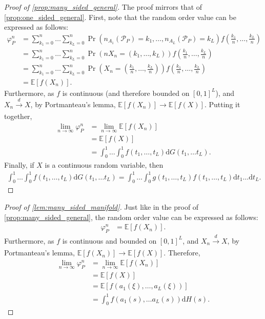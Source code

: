 \documentclass[a4paper]{article}
\newcommand{\dt}{\mathrm{d}t}
\newcommand{\dG}{\mathrm{d}G}
\newcommand{\E}{\mathbb{E}}
\begin{document}
\begin{proof}[Proof of \cref{prop:many_sided_general}]
    The proof mirrors that of \cref{prop:one_sided_general}.
    First, note that the random order value can be expressed as follows:
    \begin{align*}
        \varphi_P^n &= \sum_{k_1=0}^n \dots \sum_{k_L=0}^n \Pr(n_{A_1}(\mathcal{P}_P) = k_1, \dots, n_{A_L}(\mathcal{P}_P) = k_L) f\left(\frac{k_1}{n}, \dots, \frac{k_L}{n}\right) \\
        &= \sum_{k_1=0}^n \dots \sum_{k_L=0}^n \Pr(n X_n = (k_1, \dots, k_L)) f\left(\frac{k_1}{n}, \dots, \frac{k_L}{n}\right) \\
        &= \sum_{k_1=0}^n \dots \sum_{k_L=0}^n \Pr \left( X_n = \left(\frac{k_1}{n}, \dots, \frac{k_L}{n}\right) \right) f \left(\frac{k_1}{n}, \dots, \frac{k_L}{n}\right) \\
        &= \E[f(X_n)].
    \end{align*}
    Furthermore, as $f$ is continuous (and therefore bounded on $[0, 1]^L$), and $X_n \xrightarrow[]{d} X$, by Portmanteau's lemma, $\E[f(X_n)] \to \E[f(X)]$.
    Putting it together,
    \begin{align*}
        \lim_{n \to \infty} \varphi_P^n &= \lim_{n \to \infty} \E[f(X_n)] \\
        &= \E[f(X)] \\
        &= \int_0^1 \dots \int_0^1 f(t_1, \dots, t_L) \dG(t_1, \dots t_L).
    \end{align*}
    Finally, if $X$ is a continuous random variable, then
    \begin{align*}
        \int_0^1 \dots \int_0^1 f(t_1, \dots, t_L) \dG(t_1, \dots t_L) = \int_0^1\dots \int_0^1 g(t_1, \dots, t_L) f(t_1, \dots, t_L) \dt_1 \dots \dt_L.
    \end{align*}
\end{proof}

\begin{proof}[Proof of \cref{lem:many_sided_manifold}]
    Just like in the proof of \cref{prop:many_sided_general}, the random order value can be expressed as follows:
    \begin{align*}
        \varphi_P^n &= \E[f(X_n)].
    \end{align*}
    Furthermore, as $f$ is continuous and bounded on $[0, 1]^L$, and $X_n \xrightarrow[]{d} X$, by Portmanteau's lemma, $\E[f(X_n)] \to \E[f(X)]$.
    Therefore,
    \begin{align*}
        \lim_{n \to \infty} \varphi_P^n &= \lim_{n \to \infty} \E[f(X_n)] \\
        &= \E[f(X)] \\
        &= \E[f(a_1(\xi), \dots, a_L(\xi))] \\
        &= \int_0^1 f(a_1(s), \dots a_L(s)) \mathrm{d}H(s).
    \end{align*}
\end{proof}
\end{document}
